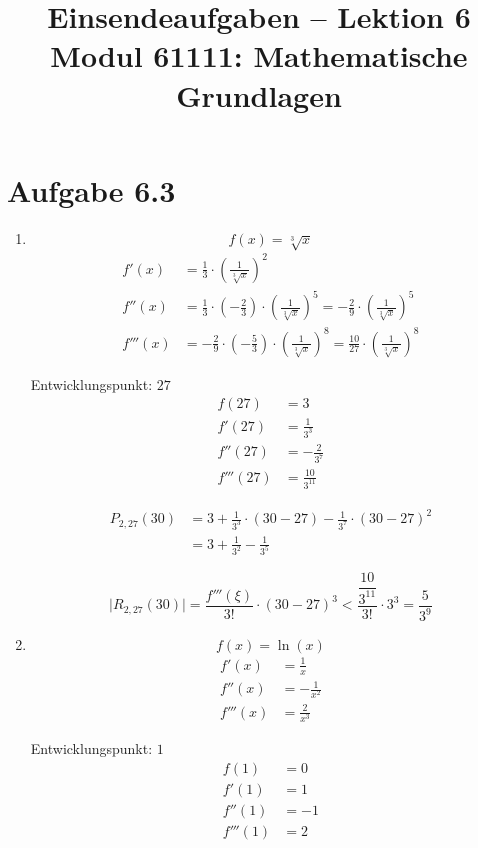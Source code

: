 \documentclass[a4paper,12pt]{article}
\title{Einsendeaufgaben -- Lektion 6\\[0.5em]
\large Modul 61111: Mathematische Grundlagen}
\author{}
\date{}
\begin{document}
\maketitle

\section*{Aufgabe 6.3}

\begin{enumerate}[label=\alph*)]

\item
\[
  f(x) = \sqrt[3]{x}
\]
\begin{align*}
  f'(x) &= \frac{1}{3} \cdot \left(\frac{1}{\sqrt[3]{x}}\right)^{2} \\[6pt]
  f''(x) &= \frac{1}{3} \cdot \left(-\frac{2}{3}\right) \cdot \left(\frac{1}{\sqrt[3]{x}}\right)^{5}
           = -\frac{2}{9} \cdot \left(\frac{1}{\sqrt[3]{x}}\right)^{5} \\[6pt]
  f'''(x) &= -\frac{2}{9} \cdot \left(-\frac{5}{3}\right) \cdot \left(\frac{1}{\sqrt[3]{x}}\right)^{8}
            = \frac{10}{27} \cdot \left(\frac{1}{\sqrt[3]{x}}\right)^{8}
\end{align*}

Entwicklungspunkt: $27$
\begin{align*}
  f(27)   &= 3 \\
  f'(27)  &= \frac{1}{3^3} \\
  f''(27) &= -\frac{2}{3^7} \\
  f'''(27) &= \frac{10}{3^{11}}
\end{align*}

\begin{align*}
  P_{2,27}(30)
  &= 3 + \frac{1}{3^3} \cdot (30-27) - \frac{1}{3^7} \cdot (30-27)^{2} \\[4pt]
  &= 3 + \frac{1}{3^2} - \frac{1}{3^5}
\end{align*}

\[
  \lvert R_{2,27}(30) \rvert
  = \frac{f'''(\xi)}{3!} \cdot (30-27)^{3}
  < \frac{\dfrac{10}{3^{11}}}{3!} \cdot 3^{3}
  = \frac{5}{3^9}
\]

\item
\[
  f(x) = \ln(x)
\]
\begin{align*}
  f'(x)   &= \frac{1}{x} \\[4pt]
  f''(x)  &= -\frac{1}{x^2} \\[4pt]
  f'''(x) &= \frac{2}{x^3}
\end{align*}

Entwicklungspunkt: $1$
\begin{align*}
  f(1)    &= 0 \\
  f'(1)   &= 1 \\
  f''(1)  &= -1 \\
  f'''(1) &= 2
\end{align*}


\end{enumerate}
\end{document}

